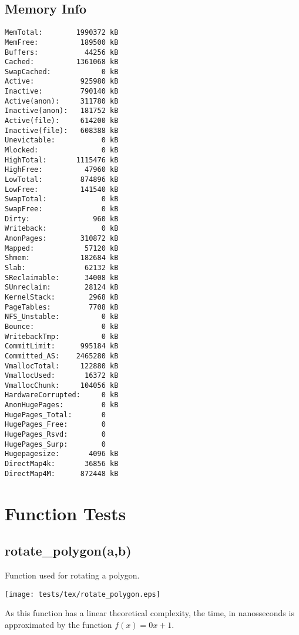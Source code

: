 \documentclass{article}
\begin{document}
\subsection{Memory Info}
\begin{verbatim}
MemTotal:        1990372 kB
MemFree:          189500 kB
Buffers:           44256 kB
Cached:          1361068 kB
SwapCached:            0 kB
Active:           925980 kB
Inactive:         790140 kB
Active(anon):     311780 kB
Inactive(anon):   181752 kB
Active(file):     614200 kB
Inactive(file):   608388 kB
Unevictable:           0 kB
Mlocked:               0 kB
HighTotal:       1115476 kB
HighFree:          47960 kB
LowTotal:         874896 kB
LowFree:          141540 kB
SwapTotal:             0 kB
SwapFree:              0 kB
Dirty:               960 kB
Writeback:             0 kB
AnonPages:        310872 kB
Mapped:            57120 kB
Shmem:            182684 kB
Slab:              62132 kB
SReclaimable:      34008 kB
SUnreclaim:        28124 kB
KernelStack:        2968 kB
PageTables:         7708 kB
NFS_Unstable:          0 kB
Bounce:                0 kB
WritebackTmp:          0 kB
CommitLimit:      995184 kB
Committed_AS:    2465280 kB
VmallocTotal:     122880 kB
VmallocUsed:       16372 kB
VmallocChunk:     104056 kB
HardwareCorrupted:     0 kB
AnonHugePages:         0 kB
HugePages_Total:       0
HugePages_Free:        0
HugePages_Rsvd:        0
HugePages_Surp:        0
Hugepagesize:       4096 kB
DirectMap4k:       36856 kB
DirectMap4M:      872448 kB
\end{verbatim}
\section{Function Tests}
\subsection{rotate\_polygon(a,b)}
Function used for rotating a polygon.

\texttt{[image: tests/tex/rotate\_polygon.eps]}

As this function has a linear theoretical
complexity, the time, in nanosseconds is 
approximated by the function $f(x)=0x+1$.
\end{document}
